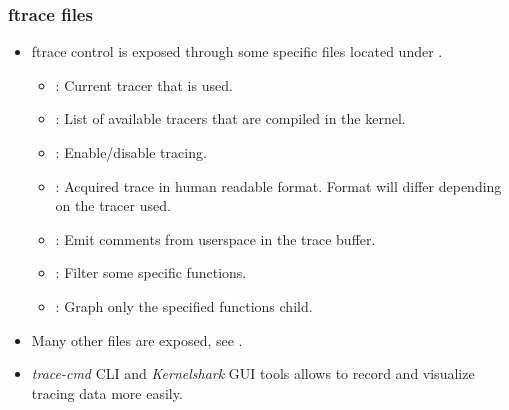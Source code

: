 \begin{frame}
  \frametitle{ftrace files}
  \begin{itemize}
    \item ftrace control is exposed through some specific files located under
          .
    \begin{itemize}
      \item {}: Current tracer that is used.
      \item {}: List of available tracers that are
            compiled in the kernel.
      \item {}: Enable/disable tracing.
      \item {}: Acquired trace in human readable format. Format will
            differ depending on the tracer used.
      \item {}: Emit comments from userspace in the
            trace buffer.
      \item {}: Filter some specific functions.
      \item {}: Graph only the specified functions child.
    \end{itemize}
    \item Many other files are exposed, see .
    \item {\em trace-cmd} CLI and {\em Kernelshark} GUI tools allows to record
          and visualize tracing data more easily.
  \end{itemize}
\end{frame}

